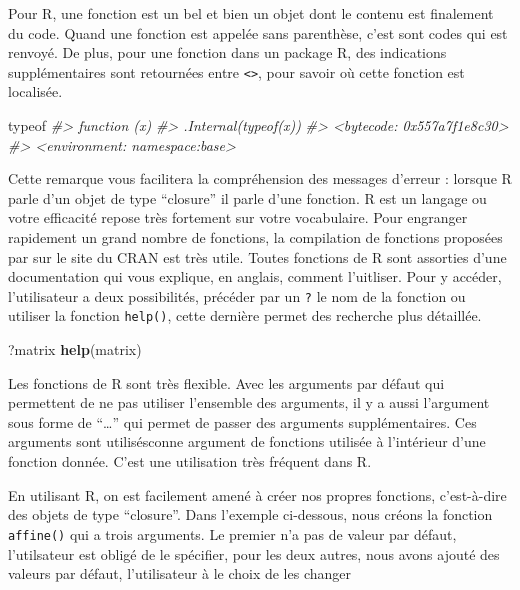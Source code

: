\documentclass[]{article}
\newenvironment{Shaded}{\begin{snugshade}}{\end{snugshade}}
\newcommand{\CommentTok}[1]{\textcolor[rgb]{0.56,0.35,0.01}{\textit{#1}}}
\newcommand{\KeywordTok}[1]{\textcolor[rgb]{0.13,0.29,0.53}{\textbf{#1}}}
\newcommand{\NormalTok}[1]{#1}
\begin{document}
Pour R, une fonction est un bel et bien un objet dont le contenu est finalement du code. Quand une fonction est appelée sans parenthèse, c'est sont codes qui est renvoyé. De plus, pour une fonction dans un package R, des indications supplémentaires sont retournées entre \texttt{<>}, pour savoir où cette fonction est localisée.

\begin{Shaded}
\begin{Highlighting}[]
\NormalTok{typeof}
\CommentTok{#> function (x) }
\CommentTok{#> .Internal(typeof(x))}
\CommentTok{#> <bytecode: 0x557a7f1e8c30>}
\CommentTok{#> <environment: namespace:base>}
\end{Highlighting}
\end{Shaded}

Cette remarque vous facilitera la compréhension des messages d'erreur : lorsque R parle d'un objet de type ``closure'' il parle d'une fonction. R est un langage ou votre efficacité repose très fortement sur votre vocabulaire. Pour engranger rapidement un grand nombre de fonctions, la compilation de fonctions proposées par sur le site du CRAN est très utile. Toutes fonctions de R sont assorties d'une documentation qui vous explique, en anglais, comment l'uitliser. Pour y accéder, l'utilisateur a deux possibilités, précéder par un \texttt{?} le nom de la fonction ou utiliser la fonction \texttt{help()}, cette dernière permet des recherche plus détaillée.

\begin{Shaded}
\begin{Highlighting}[]
\NormalTok{?matrix}
\KeywordTok{help}\NormalTok{(matrix)}
\end{Highlighting}
\end{Shaded}

Les fonctions de R sont très flexible. Avec les arguments par défaut qui permettent de ne pas utiliser l'ensemble des arguments, il y a aussi l'argument sous forme de ``\ldots{}'' qui permet de passer des arguments supplémentaires. Ces arguments sont utilisésconne argument de fonctions utilisée à l'intérieur d'une fonction donnée. C'est une utilisation très fréquent dans R.

En utilisant R, on est facilement amené à créer nos propres fonctions, c'est-à-dire des objets de type ``closure''. Dans l'exemple ci-dessous, nous créons la fonction \texttt{affine()} qui a trois arguments. Le premier n'a pas de valeur par défaut, l'utilsateur est obligé de le spécifier, pour les deux autres, nous avons ajouté des valeurs par défaut, l'utilisateur à le choix de les changer
\end{document}
